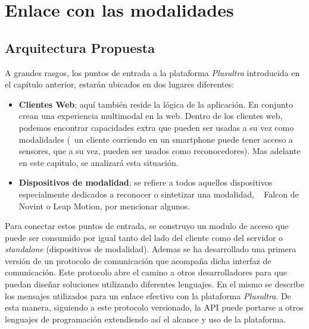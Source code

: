 
\chapter{Enlace con las modalidades} %

\label{ch:enlace} 



 

\section{Arquitectura Propuesta} \label{sec:enlace_overview}
A grandes rasgos, los puntos de entrada a la plataforma \emph{Plusultra} introducida en el capítulo anterior, estarán ubicados en dos lugares diferentes:

\begin{itemize}
\item \textbf{Clientes Web}; aquí también reside la lógica de la aplicación. En conjunto crean una experiencia multimodal en la web. Dentro de los clientes web, podemos encontrar capacidades extra que pueden ser usadas a su vez como modalidades (\ie ~un cliente corriendo en un smartphone puede tener acceso a sensores, que a su vez, pueden ser usados como reconocedores). Mas adelante en este capitulo, se analizará esta situación.
\item \textbf{Dispositivos de modalidad}; se refiere a todos aquellos dispositivos especialmente dedicados a reconocer o sintetizar una modalidad, \eg~ Falcon de Novint o Leap Motion, por mencionar algunos.
\end{itemize}

Para conectar estos puntos de entrada, se construyo un modulo de acceso que puede ser consumido por igual tanto del lado del cliente como del servidor o \emph{standalone} (dispositivos de modalidad). Ademas se ha desarrollado una primera versión de un protocolo de comunicación que acompaña dicha interfaz de comunicación. Este protocolo abre el camino a otros desarrolladores para que puedan diseñar soluciones utilizando diferentes lenguajes. 
En el mismo se describe los mensajes utilizados para un enlace efectivo con la plataforma \emph{Plusultra}. De esta manera, siguiendo a este protocolo versionado, la API puede portarse a otros lenguajes de programación extendiendo así el alcance y uso de la plataforma.


